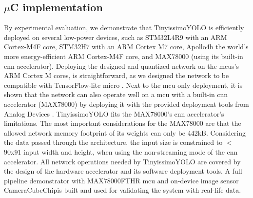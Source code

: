 \documentclass[conference]{IEEEtran}
\begin{document}
\subsection{$\mu$C implementation}
By experimental evaluation, we demonstrate that TinyissimoYOLO is efficiently deployed on several low-power devices, such as STM32L4R9 with an ARM Cortex-M4F core, STM32H7 with an ARM Cortex M7 core, Apollo4b the world's more energy-efficient ARM Cortex-M4F core, and MAX78000 (using its built-in \gls{cnn} accelerator). Deploying the designed and quantized network on the \glspl{mcu}'s ARM Cortex M cores, is straightforward, as we designed the network to be compatible with TensorFlow-lite micro \cite{david_tensorflow_2021}. Next to the \gls{mcu} only deployment, it is shown that the network can also operate well on a \gls{mcu} with a built-in \gls{cnn} accelerator (MAX78000) by deploying it with the provided deployment tools from Analog Devices \cite{noauthor_adi_2022}.
TinyissimoYOLO fits the MAX78000's \gls{cnn} accelerator's limitations. The most important considerations for the MAX78000 are that the allowed network memory footprint of its weights can only be 442kB. Considering the data passed through the architecture, the input size is constrained to $<$90x91 input width and height, when using the non-streaming mode of the \gls{cnn} accelerator. All network operations needed by TinyissimoYOLO are covered by the design of the hardware accelerator and its software deployment tools.
A full pipeline demonstrator with MAX78000FTHR \gls{mcu} and on-device image sensor CameraCubeChip\textregistered is built and used for validating the system with real-life data.

\end{document}
